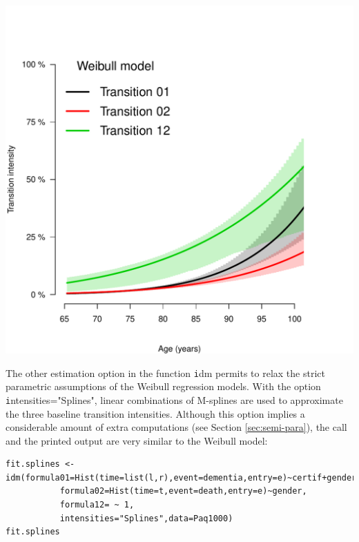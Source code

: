 \documentclass{article}
\newcommand{\code}[1]{{\texttt #1}}
\begin{document}
\includegraphics[width=.9\linewidth]{transition-intensities-paq-weib.pdf}

\bigskip

The other estimation option in the function \code{idm} permits to
relax the strict parametric assumptions of the Weibull regression
models. With the option \code{intensities="Splines"}, 
linear combinations of M-splines are
used to approximate the three baseline transition
intensities. Although this option implies a considerable amount of
extra computations (see Section \ref{sec:semi-para}), the call and the printed output are
very similar to the Weibull model:

\lstset{basicstyle=\small\tt,numbers=left,language=R}
\begin{lstlisting}
fit.splines <- idm(formula01=Hist(time=list(l,r),event=dementia,entry=e)~certif+gender,
		   formula02=Hist(time=t,event=death,entry=e)~gender,
		   formula12= ~ 1,
		   intensities="Splines",data=Paq1000)
fit.splines
\end{lstlisting}
\end{document}
